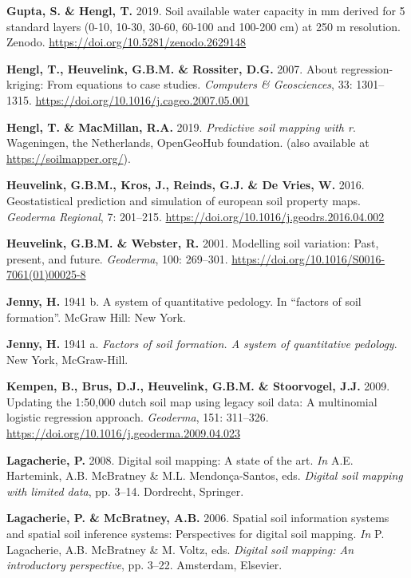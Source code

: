 \documentclass[
  10pt,
  b5paper,
  oneside]{book}
\newlength{\cslhangindent}
\newenvironment{CSLReferences}[2] %
 {\begin{list}{}{%
  \setlength{\itemindent}{0pt}
  \setlength{\leftmargin}{0pt}
  \setlength{\parsep}{0pt}
  \ifodd #1
   \setlength{\leftmargin}{\cslhangindent}
   \setlength{\itemindent}{-1\cslhangindent}
  \fi
  \setlength{\itemsep}{#2\baselineskip}}}
 {\end{list}}
\begin{document}
\begin{CSLReferences}{0}{0}
\textbf{Gupta, S. \& Hengl, T.} 2019. Soil available water capacity in mm derived for 5 standard layers (0-10, 10-30, 30-60, 60-100 and 100-200 cm) at 250 m resolution. Zenodo. \url{https://doi.org/10.5281/zenodo.2629148}

\textbf{Hengl, T., Heuvelink, G.B.M. \& Rossiter, D.G.} 2007. About regression-kriging: From equations to case studies. \emph{Computers \& Geosciences}, 33: 1301--1315. \url{https://doi.org/10.1016/j.cageo.2007.05.001}

\textbf{Hengl, T. \& MacMillan, R.A.} 2019. \emph{Predictive soil mapping with r}. Wageningen, the Netherlands, OpenGeoHub foundation. (also available at \url{https://soilmapper.org/}).

\textbf{Heuvelink, G.B.M., Kros, J., Reinds, G.J. \& De Vries, W.} 2016. Geostatistical prediction and simulation of european soil property maps. \emph{Geoderma Regional}, 7: 201--215. \url{https://doi.org/10.1016/j.geodrs.2016.04.002}

\textbf{Heuvelink, G.B.M. \& Webster, R.} 2001. Modelling soil variation: Past, present, and future. \emph{Geoderma}, 100: 269--301. \url{https://doi.org/10.1016/S0016-7061(01)00025-8}

\textbf{Jenny, H.} 1941 b. A system of quantitative pedology. In {``factors of soil formation''}. McGraw Hill: New York.

\textbf{Jenny, H.} 1941 a. \emph{Factors of soil formation. A system of quantitative pedology}. New York, McGraw-Hill.

\textbf{Kempen, B., Brus, D.J., Heuvelink, G.B.M. \& Stoorvogel, J.J.} 2009. Updating the 1:50,000 dutch soil map using legacy soil data: A multinomial logistic regression approach. \emph{Geoderma}, 151: 311--326. \url{https://doi.org/10.1016/j.geoderma.2009.04.023}

\textbf{Lagacherie, P.} 2008. Digital soil mapping: A state of the art. \emph{In} A.E. Hartemink, A.B. McBratney \& M.L. Mendonça-Santos, eds. \emph{Digital soil mapping with limited data}, pp. 3--14. Dordrecht, Springer.

\textbf{Lagacherie, P. \& McBratney, A.B.} 2006. Spatial soil information systems and spatial soil inference systems: Perspectives for digital soil mapping. \emph{In} P. Lagacherie, A.B. McBratney \& M. Voltz, eds. \emph{Digital soil mapping: An introductory perspective}, pp. 3--22. Amsterdam, Elsevier.


\end{CSLReferences}
\end{document}
